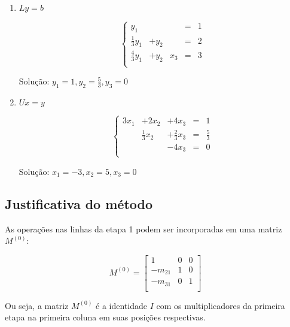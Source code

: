 \documentclass[a4paper]{article}
\begin{document}
\begin{enumerate}
\item $Ly=b$

  \begin{displaymath}
    \left\{
      \begin{array}{ccccc}
        y_1 & & &=&1\\
        \frac{1}{3} y_1 &+ y_2 &  &=& 2\\
        \frac{4}{3} y_1 &+ y_2 & x_3 &=& 3\\
      \end{array}
    \right.
  \end{displaymath}
  
Solução: $y_1 = 1, y_2 = \frac{5}{3}, y_3 = 0$

\item $Ux = y$

\begin{displaymath}
  \left\{
  \begin{array}{ccccc}
    3x_1 &+ 2x_2 &+ 4x_3 &=&1\\
     & \frac{1}{3} x_2 &+ \frac{2}{3} x_3 &=& \frac{5}{3}\\
     & & -4x_3 &=& 0\\
  \end{array}
\right.
\end{displaymath}

Solução: $x_1=-3, x_2 = 5, x_3 = 0$
\end{enumerate}

\subsection*{Justificativa do método}

As operações nas linhas da etapa 1 podem ser incorporadas em uma matriz $M^{(0)}$:

\begin{displaymath}
  M^{(0)} = \begin{bmatrix}
    1 & 0 & 0 \\
    -m_{21} & 1 & 0 \\
    -m_{31} & 0 & 1 \\
  \end{bmatrix}
\end{displaymath}

Ou seja, a matriz $M^{(0)}$ é a identidade $I$ com os multiplicadores
da primeira etapa na primeira coluna em suas posições respectivas.

\end{document}
